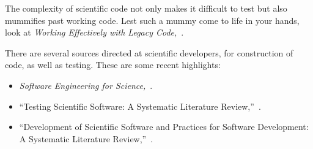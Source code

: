 \documentclass[fleqn,10pt]{olplainarticle}
\begin{document}
The complexity of scientific code not only makes it difficult
to test but also mummifies past working code. Lest such a mummy
come to life in your hands, look at \emph{Working Effectively with Legacy Code,}~\citep{feathers2004working}.

There are several sources directed at scientific developers, for
construction of code, as well as testing. These are some recent highlights:
\begin{itemize}
	\item \emph{Software Engineering for Science,}~\cite{carver2017}.
	\item ``Testing Scientific Software: A Systematic Literature Review,''~\cite{kanewala2014}.
	\item ``Development of Scientific Software and Practices for Software Development: A Systematic Literature Review,''~\cite{neumann2016}.
\end{itemize}




\printindex
\end{document}
